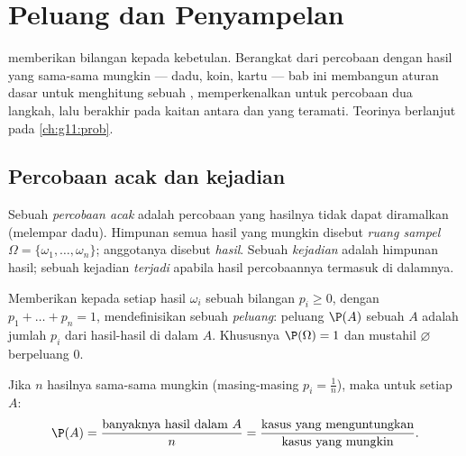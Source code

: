 \chapter{Peluang dan Penyampelan}\label{ch:g10:proba}

 memberikan bilangan kepada kebetulan. Berangkat dari percobaan dengan
hasil yang sama-sama mungkin --- dadu, koin, kartu --- bab ini membangun
aturan dasar untuk menghitung  sebuah , memperkenalkan  untuk percobaan dua langkah, lalu berakhir pada kaitan antara
 dan  yang teramati. Teorinya berlanjut pada
\cref{ch:g11:prob}.

\section{Percobaan acak dan kejadian}

\begin{definition}\label{def:g10:proba:events}
Sebuah \emph{percobaan acak} adalah percobaan yang
hasilnya tidak dapat diramalkan (melempar dadu). Himpunan semua hasil yang
mungkin disebut \emph{ruang sampel}
$\Omega = \{\omega_1, \dots, \omega_n\}$; anggotanya disebut
\emph{hasil}. Sebuah \emph{kejadian} adalah himpunan hasil;
sebuah kejadian \emph{terjadi} apabila hasil percobaannya termasuk di dalamnya.
\end{definition}

\begin{definition}\label{def:g10:proba:distribution}
Memberikan kepada setiap hasil $\omega_i$ sebuah bilangan $p_i \geq 0$, dengan
$p_1 + \dots + p_n = 1$, mendefinisikan sebuah \emph{peluang}:
peluang $\P(A)$ sebuah  $A$ adalah jumlah $p_i$ dari
hasil-hasil di dalam $A$. Khususnya $\P(\Omega) = 1$ dan  mustahil
$\varnothing$ berpeluang $0$.
\end{definition}

\begin{proposition}\label{prop:g10:proba:uniform}
Jika $n$ hasilnya sama-sama mungkin (masing-masing $p_i = \frac1n$), maka untuk
setiap  $A$:
\[
\P(A) = \frac{\text{banyaknya hasil dalam } A}{n}
= \frac{\text{kasus yang menguntungkan}}{\text{kasus yang mungkin}} .
\]
\end{proposition}

